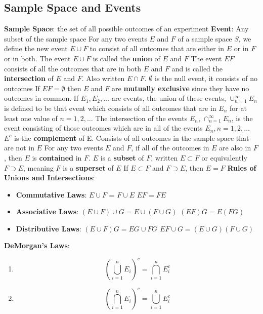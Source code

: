 \documentclass[openany]{book}
\numberwithin{equation}{section}
\begin{document}
\begin{flushleft}
\section{Sample Space and Events}
\textbf{Sample Space}: the set of all possible outcomes of an experiment \medbreak
\textbf{Event}: Any subset of the sample space \medbreak
For any two events $E$ and $F$ of a sample space $S$, we define the new event $E \cup F$ to consist of all outcomes that are either in $E$ or in $F$ or in both. \medbreak
The event $E \cup F$ is called the \textbf{union} of $E$ and $F$ \medbreak
The event $EF$ consists of all the outcomes that are in both $E$ and $F$ and is called the \textbf{intersection} of $E$ and $F$. Also written $E \cap F$. \medbreak
$\emptyset$ is the null event, it consists of no outcomes \medbreak
If $EF = \emptyset$ then $E$ and $F$ are \textbf{mutually exclusive} since they have no outcomes in common. \medbreak
If $E_1,E_2,\dots$ are events, the union of these events, $\cup_{n=1}^{\infty}E_n$ is defined to be that event which consists of all outcomes that are in $E_n$ for at least one value of $n=1,2,\dots$ \medbreak
The intersection of the events $E_n$, $\cap^\infty_{n=1} E_n$, is the event consisting of those outcomes which are in all of the events $E_n,n=1,2,\dots$ \medbreak
$E^c$ is the \textbf{complement} of E. Consists of all outcomes in the sample space that are not in $E$ \medbreak
For any two events $E$ and $F$, if all of the outcomes in $E$ are also in $F$, then $E$ is \textbf{contained} in $F$. $E$ is a \textbf{subset} of $F$, written $E \subset F$  or equivalently $F \supset E$, meaning $F$ is a \textbf{superset} of $E$ \medbreak
If $E \subset F$ and $F \supset E$, then $E=F$ \medbreak
\textbf{Rules of Unions and Intersections}:
\begin{itemize}
\item \textbf{Commutative Laws}: $E\cup F$ = $F \cup E$ \quad $EF = FE$
\item \textbf{Associative Laws}: $(E\cup F) \cup G = E \cup (F \cup G)$ \quad $(EF)G= E(FG)$
\item \textbf{Distributive Laws}: $(E\cup F)G = EG \cup FG$ \quad $EF \cup G = (E\cup G)(F \cup G)$
\end{itemize}
\textbf{DeMorgan's Laws}:
\begin{enumerate}
\item \[ \left(\bigcup_{i=1}^n E_i\right) ^c = \bigcap_{i=1}^n E_i^c
\]
\item \[ \left( \bigcap_{i=1}^n E_i\right) ^c = \bigcup_{i=1}^n E_i^c
\]
\end{enumerate}

\end{flushleft}
\end{document}
